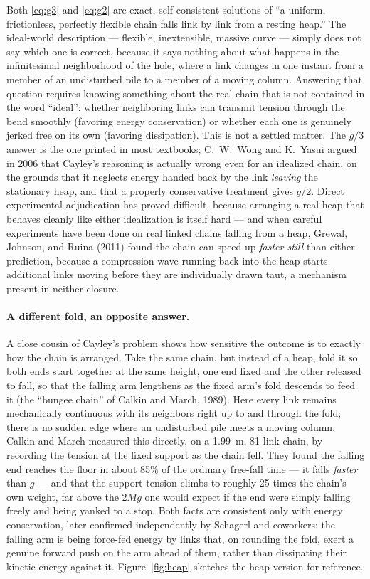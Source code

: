 \documentclass[11pt]{book}
\begin{document}
Both \eqref{eq:g3} and \eqref{eq:g2} are exact, self-consistent solutions of ``a uniform, frictionless, perfectly flexible chain falls link by link from a resting heap.'' The ideal-world description --- flexible, inextensible, massive curve --- simply does not say which one is correct, because it says nothing about what happens in the infinitesimal neighborhood of the hole, where a link changes in one instant from a member of an undisturbed pile to a member of a moving column. Answering that question requires knowing something about the real chain that is not contained in the word ``ideal'': whether neighboring links can transmit tension through the bend smoothly (favoring energy conservation) or whether each one is genuinely jerked free on its own (favoring dissipation). This is not a settled matter. The $g/3$ answer is the one printed in most textbooks; C.~W.~Wong and K.~Yasui argued in 2006 that Cayley's reasoning is actually wrong even for an idealized chain, on the grounds that it neglects energy handed back by the link \emph{leaving} the stationary heap, and that a properly conservative treatment gives $g/2$. Direct experimental adjudication has proved difficult, because arranging a real heap that behaves cleanly like either idealization is itself hard --- and when careful experiments have been done on real linked chains falling from a heap, Grewal, Johnson, and Ruina (2011) found the chain can speed up \emph{faster still} than either prediction, because a compression wave running back into the heap starts additional links moving before they are individually drawn taut, a mechanism present in neither closure.

\paragraph{A different fold, an opposite answer.} A close cousin of Cayley's problem shows how sensitive the outcome is to exactly how the chain is arranged. Take the same chain, but instead of a heap, fold it so both ends start together at the same height, one end fixed and the other released to fall, so that the falling arm lengthens as the fixed arm's fold descends to feed it (the ``bungee chain'' of Calkin and March, 1989). Here every link remains mechanically continuous with its neighbors right up to and through the fold; there is no sudden edge where an undisturbed pile meets a moving column. Calkin and March measured this directly, on a 1.99~m, 81-link chain, by recording the tension at the fixed support as the chain fell. They found the falling end reaches the floor in about 85\% of the ordinary free-fall time --- it falls \emph{faster} than $g$ --- and that the support tension climbs to roughly 25 times the chain's own weight, far above the $2Mg$ one would expect if the end were simply falling freely and being yanked to a stop. Both facts are consistent only with energy conservation, later confirmed independently by Schagerl and coworkers: the falling arm is being force-fed energy by links that, on rounding the fold, exert a genuine forward push on the arm ahead of them, rather than dissipating their kinetic energy against it. Figure~\ref{fig:heap} sketches the heap version for reference.
\end{document}
